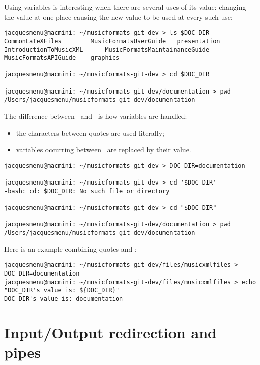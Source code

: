 Using variables is interesting when there are several uses of its value: changing the value at one place causing the new value to be used at every such use:
\begin{lstlisting}[language=Terminal]
jacquesmenu@macmini: ~/musicformats-git-dev > ls $DOC_DIR
CommonLaTeXFiles		MusicFormatsUserGuide	presentation
IntroductionToMusicXML		MusicFormatsMaintainanceGuide
MusicFormatsAPIGuide	graphics

jacquesmenu@macmini: ~/musicformats-git-dev > cd $DOC_DIR

jacquesmenu@macmini: ~/musicformats-git-dev/documentation > pwd
/Users/jacquesmenu/musicformats-git-dev/documentation
\end{lstlisting}

The difference between \quotes\ and \doubleQuotes\ is how variables are handled:
\begin{itemize}
\item the characters between quotes are used literally;
\item variables occurring between \doubleQuotes\ are replaced by their value.
\end{itemize}

\begin{lstlisting}[language=Terminal]
jacquesmenu@macmini: ~/musicformats-git-dev > DOC_DIR=documentation

jacquesmenu@macmini: ~/musicformats-git-dev > cd '$DOC_DIR'
-bash: cd: $DOC_DIR: No such file or directory

jacquesmenu@macmini: ~/musicformats-git-dev > cd "$DOC_DIR"

jacquesmenu@macmini: ~/musicformats-git-dev/documentation > pwd
/Users/jacquesmenu/musicformats-git-dev/documentation
\end{lstlisting}

Here is an example combining quotes and \doubleQuotes:
\begin{lstlisting}[language=Terminal]
jacquesmenu@macmini: ~/musicformats-git-dev/files/musicxmlfiles > DOC_DIR=documentation
jacquesmenu@macmini: ~/musicformats-git-dev/files/musicxmlfiles > echo "DOC_DIR's value is: ${DOC_DIR}"
DOC_DIR's value is: documentation
\end{lstlisting}


\section{Input/Output redirection and pipes}

